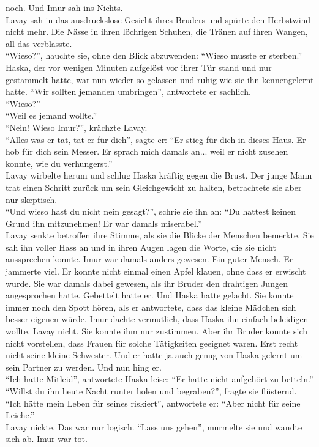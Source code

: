 noch. Und Imur sah ins Nichts.\\
Lavay sah in das ausdruckslose Gesicht ihres Bruders und spürte den Herbstwind nicht mehr. Die 
Nässe in ihren löchrigen Schuhen, die Tränen auf ihren Wangen, all das verblasste. \\
``Wieso?'', hauchte sie, ohne den Blick abzuwenden: ``Wieso musste er sterben.''\\
Haska, der vor wenigen Minuten aufgelöst vor ihrer Tür stand und nur gestammelt hatte, war nun 
wieder so gelassen und ruhig wie sie ihn kennengelernt hatte. ``Wir sollten jemanden umbringen'', 
antwortete er sachlich.\\
``Wieso?''\\
``Weil es jemand wollte.''\\
``Nein! Wieso Imur?'', krächzte Lavay.\\
``Alles was er tat, tat er für dich'', sagte er: ``Er stieg für dich in dieses Haus. Er hob für 
dich sein Messer. Er sprach mich damals an... weil er nicht zusehen konnte, wie du verhungerst.''\\
Lavay wirbelte herum und schlug Haska kräftig gegen die Brust. Der junge Mann trat einen Schritt 
zurück um sein Gleichgewicht zu halten, betrachtete sie aber nur skeptisch. \\
``Und wieso hast du nicht nein gesagt?'', schrie sie ihn an: ``Du hattest keinen Grund ihn 
mitzunehmen! Er war damals miserabel.''\\
Lavay senkte betroffen ihre Stimme, als sie die Blicke der Menschen bemerkte. Sie sah ihn voller 
Hass an und in ihren Augen lagen die Worte, die sie nicht aussprechen konnte. Imur war damals 
anders gewesen. Ein guter Mensch. Er jammerte viel. Er konnte nicht einmal einen Apfel klauen, ohne 
dass er erwischt wurde. Sie war damals dabei gewesen, als ihr Bruder den drahtigen Jungen 
angesprochen hatte. Gebettelt hatte er. Und Haska hatte gelacht. Sie konnte immer noch den Spott 
hören, als er antwortete, dass das kleine Mädchen sich besser eigenen würde. Imur dachte vermutlich, 
dass Haska ihn einfach beleidigen wollte. Lavay nicht. Sie konnte ihm nur zustimmen. Aber ihr Bruder 
konnte sich nicht vorstellen, dass Frauen für solche Tätigkeiten geeignet waren. Erst recht nicht 
seine kleine Schwester. Und er hatte ja auch genug von Haska gelernt um sein Partner zu werden. Und 
nun hing er. \\
``Ich hatte Mitleid'', antwortete Haska leise: ``Er hatte nicht aufgehört zu betteln.''\\
``Willst du ihn heute Nacht runter holen und begraben?'', fragte sie flüsternd.\\
``Ich hätte mein Leben für seines riskiert'', antwortete er: ``Aber nicht für seine Leiche.''\\
Lavay nickte. Das war nur logisch. ``Lass uns gehen'', murmelte sie und wandte sich ab. Imur war 
tot. \\

